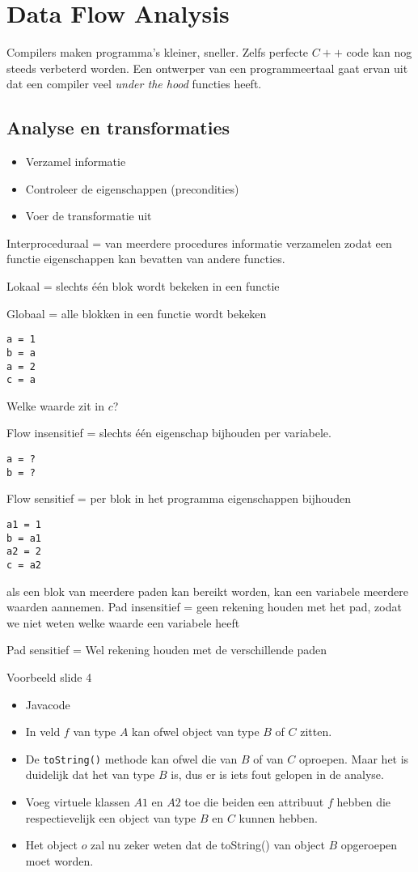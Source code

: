 \chapter{Data Flow Analysis}
Compilers maken programma's kleiner, sneller. Zelfs perfecte $C++$ code kan nog steeds verbeterd worden. Een ontwerper van een programmeertaal gaat ervan uit dat een compiler veel \textit{under the hood} functies heeft.


\section{Analyse en transformaties}
\begin{itemize}
	\item Verzamel informatie
	\item Controleer de eigenschappen (precondities)
	\item Voer de transformatie uit
\end{itemize}

Interproceduraal = van meerdere procedures informatie verzamelen zodat een functie eigenschappen kan bevatten van andere functies.

Lokaal = slechts één blok wordt bekeken in een functie

Globaal = alle blokken in een functie wordt bekeken


\begin{lstlisting}
a = 1
b = a
a = 2
c = a
\end{lstlisting}
Welke waarde zit in $c$? 

Flow insensitief = slechts één eigenschap bijhouden per variabele.
\begin{lstlisting}
a = ?
b = ?
\end{lstlisting}

Flow sensitief = per blok in het programma eigenschappen bijhouden
\begin{lstlisting}
a1 = 1
b = a1
a2 = 2
c = a2
\end{lstlisting}

als een blok van meerdere paden kan bereikt worden, kan een variabele meerdere waarden aannemen.
Pad insensitief =  geen rekening houden met het pad, zodat we niet weten welke waarde een variabele heeft



Pad sensitief = Wel rekening houden met de verschillende paden


Voorbeeld slide 4
\begin{itemize}
	\item Javacode
	\item In veld $f$ van type $A$ kan ofwel object van type $B$ of $C$ zitten.	
	\item De \texttt{toString()} methode kan ofwel die van $B$ of van $C$ oproepen. Maar het is duidelijk dat het van type $B$ is, dus er is iets fout gelopen in de analyse.
	\item Voeg virtuele klassen $A1$ en $A2$ toe die beiden een attribuut $f$ hebben die respectievelijk een object van type $B$ en $C$ kunnen hebben.
	\item Het object $o$ zal nu zeker weten dat de toString() van object $B$ opgeroepen moet worden.
\end{itemize}


